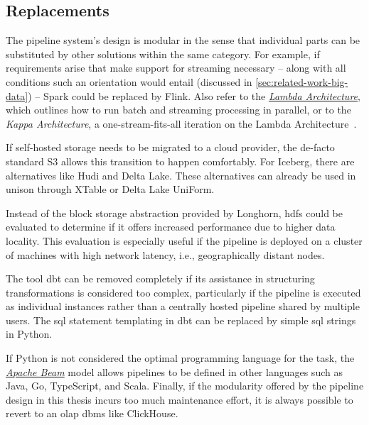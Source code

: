 \subsection{Replacements}
\label{sec:future-work-replacements}

The pipeline system's design is modular in the sense that individual parts can be substituted by other solutions within the same category.
For example, if requirements arise that make support for streaming necessary -- along with all conditions such an orientation would entail (discussed in \cref{sec:related-work-big-data}) -- Spark could be replaced by Flink.
Also refer to the \href{https://www.databricks.com/glossary/lambda-architecture}{\textit{Lambda Architecture}}, which outlines how to run batch and streaming processing in parallel, or to the \textit{Kappa Architecture}, a one-stream-fits-all iteration on the Lambda Architecture~\cite{Marz2011, Kreps2014}.

If self-hosted storage needs to be migrated to a cloud provider, the de-facto standard S3 allows this transition to happen comfortably.
For Iceberg, there are alternatives like Hudi and Delta Lake.
These alternatives can already be used in unison through XTable or Delta Lake UniForm.

Instead of the block storage abstraction provided by Longhorn, \ac{hdfs} could be evaluated to determine if it offers increased performance due to higher data locality.
This evaluation is especially useful if the pipeline is deployed on a cluster of machines with high network latency, i.e., geographically distant nodes.

The tool dbt can be removed completely if its assistance in structuring transformations is considered too complex, particularly if the pipeline is executed as individual instances rather than a centrally hosted pipeline shared by multiple users.
The \ac{sql} statement templating in dbt can be replaced by simple \ac{sql} strings in Python.

If Python is not considered the optimal programming language for the task, the \href{https://beam.apache.org/}{\textit{Apache Beam}} model allows pipelines to be defined in other languages such as Java, Go, TypeScript, and Scala.
Finally, if the modularity offered by the pipeline design in this thesis incurs too much maintenance effort, it is always possible to revert to an \ac{olap} \ac{dbms} like ClickHouse.
